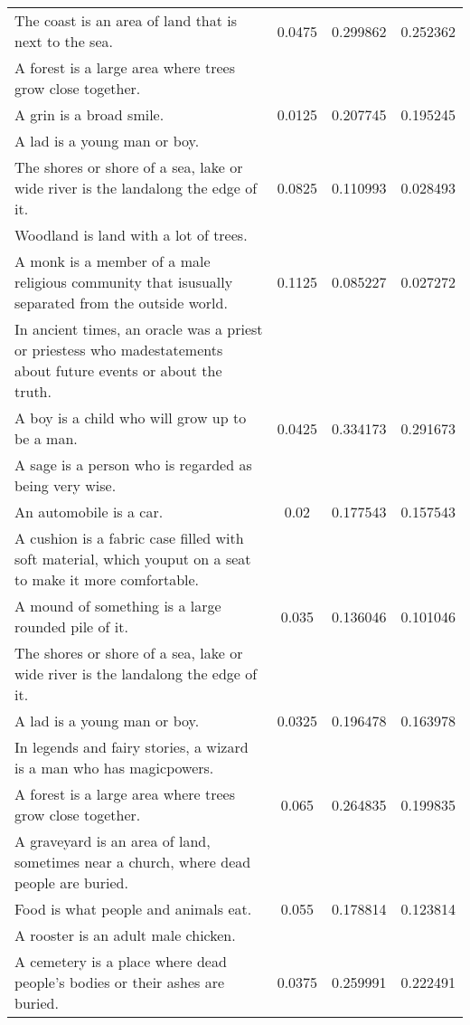 \begin{table}[p]
\begin{center}
{\begin{tabular}{|p{9cm}|c|c|c|}
\hline
The coast is an area of land that is next to the sea. & 0.0475 & 0.299862 & 0.252362 \\
A forest is a large area where trees grow close together. & & & \\
\hline
A grin is a broad smile. & 0.0125 & 0.207745 & 0.195245 \\
A lad is a young man or boy. & & & \\
\hline
The shores or shore of a sea, lake or wide river is the landalong the edge of it. & 0.0825 & 0.110993 & 0.028493 \\
Woodland is land with a lot of trees. & & & \\
\hline
A monk is a member of a male religious community that isusually separated from the outside world. & 0.1125 & 0.085227 & 0.027272 \\
In ancient times, an oracle was a priest or priestess who madestatements about future events or about the truth. & & & \\
\hline
A boy is a child who will grow up to be a man. & 0.0425 & 0.334173 & 0.291673 \\
A sage is a person who is regarded as being very wise. & & & \\
\hline
An automobile is a car. & 0.02 & 0.177543 & 0.157543 \\
A cushion is a fabric case filled with soft material, which youput on a seat to make it more comfortable. & & & \\
\hline
A mound of something is a large rounded pile of it. & 0.035 & 0.136046 & 0.101046 \\
The shores or shore of a sea, lake or wide river is the landalong the edge of it. & & & \\
\hline
A lad is a young man or boy. & 0.0325 & 0.196478 & 0.163978 \\
In legends and fairy stories, a wizard is a man who has magicpowers. & & & \\
\hline
A forest is a large area where trees grow close together. & 0.065 & 0.264835 & 0.199835 \\
A graveyard is an area of land, sometimes near a church, where dead people are buried. & & & \\
\hline
Food is what people and animals eat. & 0.055 & 0.178814 & 0.123814 \\
A rooster is an adult male chicken. & & & \\
\hline
A cemetery is a place where dead people's bodies or their ashes are buried. & 0.0375 & 0.259991 & 0.222491 \\

\end{tabular}}
\end{center}
\end{table}
